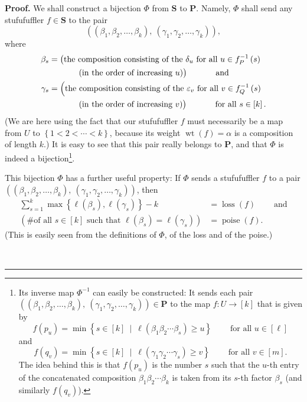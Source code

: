 \documentclass[numbers=enddot,12pt,final,onecolumn,notitlepage]{scrartcl}%
\theoremstyle{definition}
\newenvironment{proof}[1][Proof]{\noindent\textbf{#1.} }{\ \rule{0.5em}{0.5em}}
\let\sumnonlimits\sum
\renewcommand{\sum}{\sumnonlimits\limits}
\begin{document}
\begin{proof}
We shall construct a bijection $\Phi$ from $\mathbf{S}$ to $\mathbf{P}$.
Namely, $\Phi$ shall send any stufufuffler $f\in\mathbf{S}$ to the pair
\[
\left(  \left(  \beta_{1},\beta_{2},\ldots,\beta_{k}\right)  ,\ \left(
\gamma_{1},\gamma_{2},\ldots,\gamma_{k}\right)  \right)  ,
\]
where
\begin{align*}
\beta_{s}  &  =\left(  \text{the composition consisting of the }\delta
_{u}\text{ for all }u\in f_{P}^{-1}\left(  s\right)  \right. \\
&  \ \ \ \ \ \ \ \ \ \ \left.  \text{(in the order of increasing }%
u\text{)}\vphantom{f_P^{-1}}\right)  \ \ \ \ \ \ \ \ \ \ \text{and}\\
\gamma_{s}  &  =\left(  \text{the composition consisting of the }%
\varepsilon_{v}\text{ for all }v\in f_{Q}^{-1}\left(  s\right)  \right. \\
&  \ \ \ \ \ \ \ \ \ \ \left.  \text{(in the order of increasing }%
v\text{)}\vphantom{f_P^{-1}}\right)  \ \ \ \ \ \ \ \ \ \ \text{for all }%
s\in\left[  k\right]  .
\end{align*}
(We are here using the fact that our stufufuffler $f$ must necessarily be a
map from $U$ to $\left\{  1<2<\cdots<k\right\}  $, because its weight
$\operatorname*{wt}\left(  f\right)  =\alpha$ is a composition of length $k$.)
It is easy to see that this pair really belongs to $\mathbf{P}$, and that
$\Phi$ is indeed a bijection\footnote{Its inverse map $\Phi^{-1}$ can easily
be constructed: It sends each pair $\left(  \left(  \beta_{1},\beta_{2}%
,\ldots,\beta_{k}\right)  ,\ \left(  \gamma_{1},\gamma_{2},\ldots,\gamma
_{k}\right)  \right)  \in\mathbf{P}$ to the map $f:U\rightarrow\left[
k\right]  $ that is given by%
\[
f\left(  p_{u}\right)  =\min\left\{  s\in\left[  k\right]  \ \mid\ \ell\left(
\beta_{1}\beta_{2}\cdots\beta_{s}\right)  \geq u\right\}
\ \ \ \ \ \ \ \ \ \ \text{for all }u\in\left[  \ell\right]
\]
and%
\[
f\left(  q_{v}\right)  =\min\left\{  s\in\left[  k\right]  \ \mid\ \ell\left(
\gamma_{1}\gamma_{2}\cdots\gamma_{s}\right)  \geq v\right\}
\ \ \ \ \ \ \ \ \ \ \text{for all }v\in\left[  m\right]  .
\]
The idea behind this is that $f\left(  p_{u}\right)  $ is the number $s$ such
that the $u$-th entry of the concatenated composition $\beta_{1}\beta
_{2}\cdots\beta_{k}$ is taken from its $s$-th factor $\beta_{s}$ (and
similarly $f\left(  q_{v}\right)  $).}.

This bijection $\Phi$ has a further useful property: If $\Phi$ sends a
stufufuffler $f$ to a pair $\left(  \left(  \beta_{1},\beta_{2},\ldots
,\beta_{k}\right)  ,\ \left(  \gamma_{1},\gamma_{2},\ldots,\gamma_{k}\right)
\right)  $, then%
\begin{align*}
\sum_{s=1}^{k}\max\left\{  \ell\left(  \beta_{s}\right)  ,\ell\left(
\gamma_{s}\right)  \right\}  -k  &  =\operatorname*{loss}\left(  f\right)
\ \ \ \ \ \ \ \ \ \ \text{and}\\
\left(  \text{\# of all }s\in\left[  k\right]  \text{ such that }\ell\left(
\beta_{s}\right)  =\ell\left(  \gamma_{s}\right)  \right)   &
=\operatorname*{poise}\left(  f\right)  .
\end{align*}
(This is easily seen from the definitions of $\Phi$, of the loss and of the poise.)


\end{proof}
\end{document}
